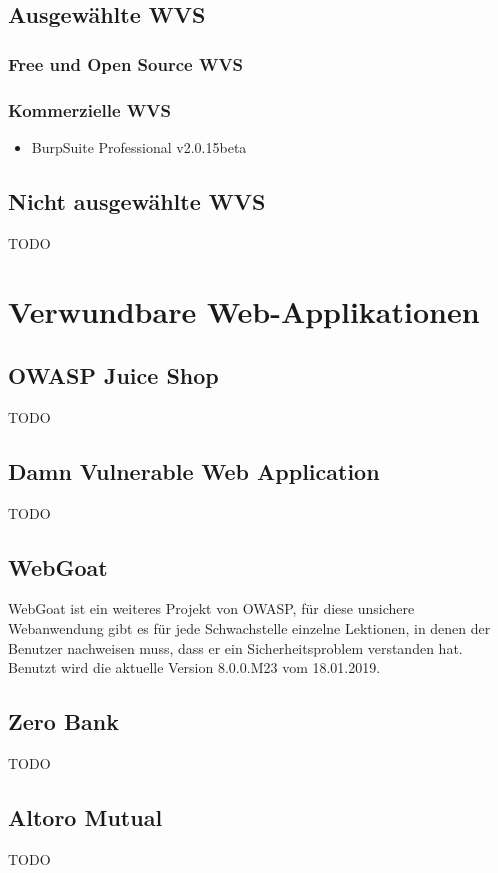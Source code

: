 \documentclass[12pt,oneside,a4paper,parskip]{scrbook}
\begin{document}
  \subsection{Ausgewählte WVS}
    \subsubsection{Free und Open Source WVS}

    \subsubsection{Kommerzielle WVS}
      \begin{itemize}
        \item BurpSuite Professional v2.0.15beta
      \end{itemize}

  \subsection{Nicht ausgewählte WVS}
  TODO

\section{Verwundbare Web-Applikationen}
  \subsection{OWASP Juice Shop}
  TODO
  \subsection{Damn Vulnerable Web Application}
  TODO
  \subsection{WebGoat}
  WebGoat ist ein weiteres Projekt von OWASP, für diese unsichere Webanwendung gibt es für jede Schwachstelle einzelne Lektionen, in denen der Benutzer nachweisen muss, dass er ein Sicherheitsproblem verstanden hat. Benutzt wird die aktuelle Version 8.0.0.M23 vom 18.01.2019.

  \subsection{Zero Bank}
  TODO
  \subsection{Altoro Mutual}
  TODO
\end{document}
